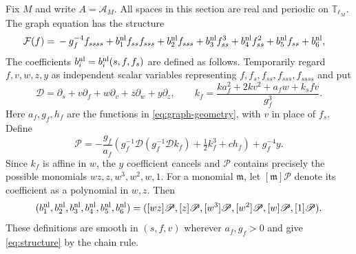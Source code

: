 \documentclass[a4paper,11pt]{article}
\numberwithin{equation}{section}
\theoremstyle{definition}
\theoremstyle{remark}
\newcommand{\T}{\mathbb T}
\newcommand{\calF}{\mathcal F}
\begin{document}
Fix $M$ and write $A=\mathcal A_M$. All spaces in this section are real and periodic on $\T_{\ell_M}$. The graph equation has the structure
\begin{equation}\label{eq:structure}
 \begin{aligned}
 \calF(f)={}&-g_f^{-4}f_{ssss}+b_1^{\rm nl}f_{ss}f_{sss}+b_2^{\rm nl}f_{sss}
              +b_3^{\rm nl}f_{ss}^3+b_4^{\rm nl}f_{ss}^2+b_5^{\rm nl}f_{ss}+b_6^{\rm nl},
 \end{aligned}
\end{equation}
The coefficients $b_i^{\rm nl}=b_i^{\rm nl}(s,f,f_s)$ are defined as follows. Temporarily regard $f,v,w,z,y$ as independent scalar variables representing $f,f_s,f_{ss},f_{sss},f_{ssss}$ and put
\[
 \mathscr D=\partial_s+v\partial_f+w\partial_v+z\partial_w+y\partial_z,
 \qquad k_f=\frac{ka_f^2+2kv^2+a_fw+k_sfv}{g_f^3}.
\]
Here $a_f,g_f,h_f$ are the functions in \eqref{eq:graph-geometry}, with $v$ in place of $f_s$. Define
\[
 \mathscr P=-\frac{g_f}{a_f}
 \left(g_f^{-1}\mathscr D(g_f^{-1}\mathscr D k_f)+\tfrac12k_f^3+ch_f\right)
 +g_f^{-4}y.
\]
Since $k_f$ is affine in $w$, the $y$ coefficient cancels and $\mathscr P$ contains precisely the possible monomials $wz,z,w^3,w^2,w,1$. For a monomial $\mathfrak m$, let $[\mathfrak m]\mathscr P$ denote its coefficient as a polynomial in $w,z$. Then
\[
 (b_1^{\rm nl},b_2^{\rm nl},b_3^{\rm nl},b_4^{\rm nl},b_5^{\rm nl},b_6^{\rm nl})
 =([wz]\mathscr P,[z]\mathscr P,[w^3]\mathscr P,[w^2]\mathscr P,[w]\mathscr P,[1]\mathscr P).
\]
These definitions are smooth in $(s,f,v)$ wherever $a_f,g_f>0$ and give \eqref{eq:structure} by the chain rule.
\end{document}
